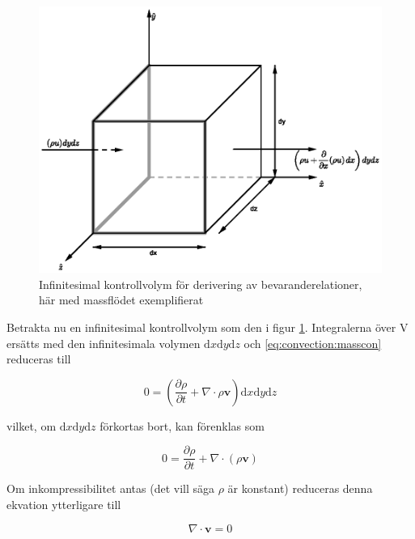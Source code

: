 \begin{figure}[hpbt]
\centering
\includegraphics[scale=1]{images/massflowcube.eps}
\caption{\label{fig:massflowcube} Infinitesimal kontrollvolym för derivering av bevaranderelationer, här med massflödet exemplifierat}
\end{figure}

Betrakta nu en infinitesimal kontrollvolym som den i figur \ref{fig:massflowcube}. Integralerna över V ersätts med den infinitesimala volymen $\mathrm{d}x\mathrm{d}y\mathrm{d}z$ och \eqref{eq:convection:masscon} reduceras till

\begin{equation}
\label{eq:convection:massconinf}
0 = \left( \frac{\partial \rho}{\partial t} + \nabla \cdot \rho \mathbf{v}\right) \mathrm{d}x\mathrm{d}y\mathrm{d}z
\end{equation}

vilket, om $\mathrm{d}x\mathrm{d}y\mathrm{d}z$ förkortas bort, kan förenklas som

\begin{equation}
\label{eq:convection:continuity}
\boxed{ \; \; \;
0 = \frac{\partial \rho}{\partial t} + \nabla \cdot \left( \rho \mathbf{v} \right) 
\; \; \; }
\end{equation}

Om inkompressibilitet antas (det vill säga $\rho$ är konstant) reduceras denna ekvation ytterligare till

\begin{equation}
\label{eq:convection:continuityinc}
\nabla \cdot \mathbf{v} = 0
\end{equation}

